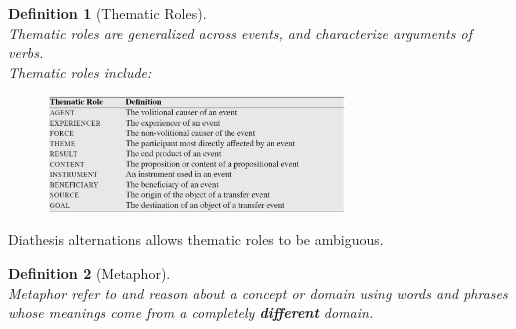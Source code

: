 \documentclass[12pt]{article}
\newtheorem{definition}{Definition}[section]
\theoremstyle{definition}
\begin{document}
\newpage
\begin{definition}[Thematic Roles]
\hfill\\\normalfont Thematic roles are generalized across events, and characterize arguments of verbs.\\
Thematic roles include:
\begin{figure}[h]
\centering
\includegraphics[width=0.7\textwidth]{thematicroles.jpg}
\end{figure}
\end{definition}
Diathesis alternations allows thematic roles to be ambiguous.
\begin{definition}[Metaphor]
\hfill\\\normalfont Metaphor refer to and reason about a concept or domain using words and phrases whose meanings come from a completely \textbf{different} domain.
\end{definition}
\clearpage
\end{document}
